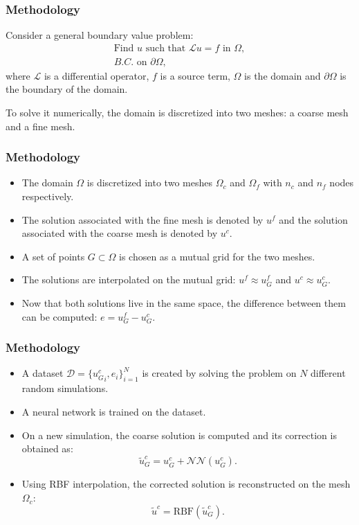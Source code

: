 \documentclass{beamer}
\begin{document}
\begin{frame}
\frametitle{Methodology}
Consider a general boundary value problem:
\[
    \begin{split}
        \text{Find } u \text{ such that } \mathcal{L}u = f \text{ in } \Omega,\\
        B.C. \text{ on } \partial \Omega,
    \end{split}
\]
where \(\mathcal{L}\) is a differential operator, \(f\) is a source term, \(\Omega\) is the domain and \(\partial \Omega\) is the boundary of the domain. 

\vspace{0.5cm}
To solve it numerically, the domain is discretized into two meshes: a coarse mesh and a fine mesh. 
\end{frame}

\begin{frame}
\frametitle{Methodology}
\begin{itemize}
    \item The domain \( \Omega \) is discretized into two meshes \( \Omega_c \) and \( \Omega_f \) with \( n_c \) and \( n_f \) nodes respectively. 
    \item The solution associated with the fine mesh is denoted by \( u^f \) and the solution associated with the coarse mesh is denoted by \( u^c \).
    \item A set of points \(G \subset \Omega\) is chosen as a mutual grid for the two meshes.
    \item The solutions are interpolated on the mutual grid: \( u^f \approx u^f_G \) and \( u^c \approx u^c_G \).
    \item Now that both solutions live in the same space, the difference between them can be computed: \( e = u^f_G - u^c_G \).
\end{itemize}
\end{frame}

\begin{frame}
\frametitle{Methodology}
\begin{itemize}
    \item A dataset \(\mathcal{D} = \{{u_G^c}_i, e_i\}_{i=1}^N\) is created by solving the problem on \(N\) different random simulations.
    \item A neural network is trained on the dataset.
    \item On a new simulation, the coarse solution is computed and its correction is obtained as: 
    \[
        \tilde{u}_G^c = u_G^c + \mathcal{NN}(u_G^c).
    \]
    \item Using RBF interpolation, the corrected solution is reconstructed on the mesh \( \Omega_c \):
    \[
        \tilde{u}^c = \text{RBF}(\tilde{u}_G^c).
    \]
\end{itemize}
\end{frame}
\end{document}
